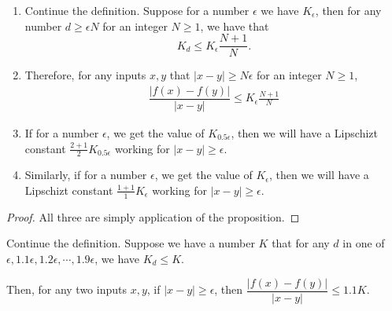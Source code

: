 \documentclass{llncs}
\begin{document}
\begin{corollary}
	\begin{enumerate}
		\item Continue the definition. Suppose for a number $\epsilon$ we have $K_\epsilon$, then for any number $d\geq \epsilon N$ for an integer $N \geq 1$, we have that $$K_d \leq K_\epsilon\frac{N+1}{N}.$$ 
		
		\item Therefore, for any inputs $x,y$ that $|x-y|\geq N\epsilon$ for an integer $N\geq 1$, \begin{align*}
			\dfrac{|f(x)-f(y)|}{|x-y|}\leq K_\epsilon\frac{N+1}{N}
		\end{align*}
		
		\item 	If for a number $\epsilon$, we get the value of $K_{0.5 \epsilon}$, then we will have a Lipschizt constant $\frac{2+1}{2}K_{0.5 \epsilon}$ working for $|x-y|\geq\epsilon$.
		
		
		\item 	Similarly, if for a number $\epsilon$, we get the value of $K_{\epsilon}$, then we will have a Lipschizt constant $\frac{1+1}{1}K_{\epsilon}$ working for $|x-y|\geq\epsilon$.
	\end{enumerate}
\end{corollary}

\begin{proof}
	All three are simply application of the proposition.
\end{proof}

\begin{proposition}
	Continue the definition. Suppose we have a number $K$ that for any $d$ in one of $\epsilon, 1.1\epsilon, 1.2\epsilon, \cdots, 1.9\epsilon$, we have $K_d\leq K$.
	
	Then, for any two inputs $x,y$, if $|x-y|\geq \epsilon$, then $\dfrac{|f(x)-f(y)|}{|x-y|}\leq 1.1 K$. 
\end{proposition}
\end{document}
